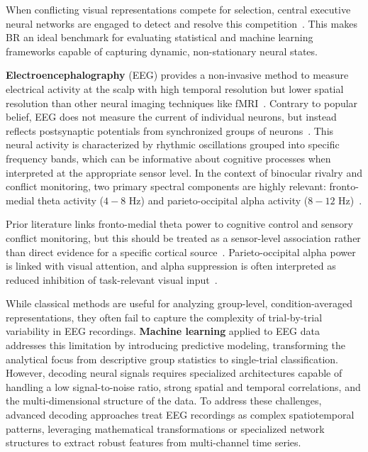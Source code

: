 \documentclass[11pt,a4paper,chapterprefix=false,parskip=false]{scrreprt}
\begin{document}
When conflicting visual representations compete for selection, central executive neural networks are engaged to detect and resolve this competition~\citep{drew_conflict_2022}. This makes BR an ideal benchmark for evaluating statistical and machine learning frameworks capable of capturing dynamic, non-stationary neural states.


\textbf{Electroencephalography} (EEG) provides a non-invasive method to measure electrical activity at the scalp with high temporal resolution but lower spatial resolution than other neural imaging techniques like fMRI~\cite{biasiucci_electroencephalography_2019}. Contrary to popular belief, EEG does not measure the current of individual neurons, but instead reflects postsynaptic potentials from synchronized groups of neurons~\cite{biasiucci_electroencephalography_2019, nunez_electric_2006}. This neural activity is characterized by rhythmic oscillations grouped into specific frequency bands, which can be informative about cognitive processes when interpreted at the appropriate sensor level. In the context of binocular rivalry and conflict monitoring, two primary spectral components are highly relevant: fronto-medial theta activity ($4-8$ Hz) and parieto-occipital alpha activity ($8-12$ Hz)~\cite{drew_neural_nodate, torralba_cuello_alpha_2022}.


Prior literature links fronto-medial theta power to cognitive control and sensory conflict monitoring, but this should be treated as a sensor-level association rather than direct evidence for a specific cortical source~\cite{drew_conflict_2022, drew_binocular_2026, nunez_electric_2006}. Parieto-occipital alpha power is linked with visual attention, and alpha suppression is often interpreted as reduced inhibition of task-relevant visual input~\cite{torralba_cuello_alpha_2022}.


While classical methods are useful for analyzing group-level, condition-averaged representations, they often fail to capture the complexity of trial-by-trial variability in EEG recordings. \textbf{Machine learning} applied to EEG data addresses this limitation by introducing predictive modeling, transforming the analytical focus from descriptive group statistics to single-trial classification. However, decoding neural signals requires specialized architectures capable of handling a low signal-to-noise ratio, strong spatial and temporal correlations, and the multi-dimensional structure of the data. To address these challenges, advanced decoding approaches treat EEG recordings as complex spatiotemporal patterns, leveraging mathematical transformations or specialized network structures to extract robust features from multi-channel time series.
\end{document}
